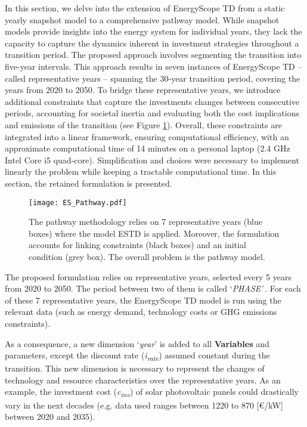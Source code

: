 In this section, we delve into the extension of EnergyScope TD from a static yearly snapshot model to a comprehensive pathway model. While snapshot models provide insights into the energy system for individual years, they lack the capacity to capture the dynamics inherent in investment strategies throughout a transition period. The proposed approach involves segmenting the transition into five-year intervals. This approach results in seven instances of EnergyScope TD -- called representative years -- spanning the 30-year transition period, covering the years from 2020 to 2050. To bridge these representative years, we introduce additional constraints that capture the investments changes between consecutive periods, accounting for societal inertia and evaluating both the cost implications and emissions of the transition (see Figure \ref{fig:meth_path_methodology_app}). Overall, these constraints are integrated into a linear framework, ensuring computational efficiency, with an approximate computational time of 14 minutes on a personal laptop (2.4 GHz Intel Core i5 quad-core). Simplification and choices were necessary to implement linearly the problem while keeping a tractable computational time. In this section, the retained formulation is presented.

\begin{figure}[!htbp]
\centering
\texttt{[image: ES\_Pathway.pdf]}
\caption{The pathway methodology relies on 7 representative years (blue boxes) where the model \gls{ESTD} is applied. Moreover, the formulation accounts for linking constraints (black boxes) and an initial condition (grey box). The overall problem is the pathway model.}
\label{fig:meth_path_methodology_app}
\end{figure}

\newpage
The proposed formulation relies on representative years, selected every 5 years from 2020 to 2050.  The period between two of them is called `\emph{PHASE}´.
For each of these 7 representative years, the EnergyScope TD model is run  using the relevant data (such as energy demand, technology costs or \gls{GHG} emissions constraints). 

As a consequence, a new dimension `\emph{year}' is added to all \textbf{Variables} and parameters, except the discount rate (\emph{i\textsubscript{rate}}) assumed constant during the transition. This new dimension is necessary to represent the changes of technology and resource characteristics over the representative years. 
As an example, the investment cost (\emph{c}\textsubscript{\emph{inv}}) of solar photovoltaic panels could drastically vary in the next decades (e.g. data used ranges between 1220 to 870  [€/kW] between 2020 and 2035). \\

